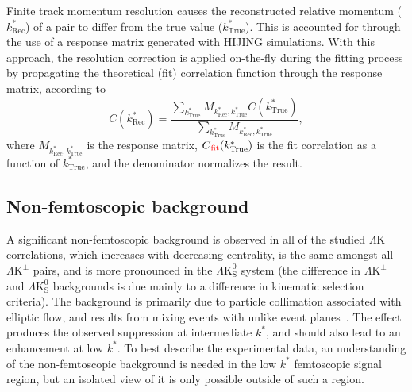 \documentclass[ALICE,manyauthors]{cernphprep}
\newcommand{\kstar}{$k^{*}$\xspace}
\newcommand{\ktrue}{$k^{*}_{\mathrm{True}}$\xspace}
\newcommand{\krec}{$k^{*}_{\mathrm{Rec}}$\xspace}
\newcommand{\LamK}{$\Lambda$K\xspace}
\newcommand{\LamKpm}{$\Lambda\mathrm{K^{\pm}}$\xspace}
\newcommand{\LamKs}{$\Lambda\mathrm{K^{0}_{S}}$\xspace}
\begin{document}
Finite track momentum resolution causes the reconstructed relative momentum (\krec) of a pair to differ from the true value (\ktrue).
This is accounted for through the use of a response matrix generated with HIJING simulations.
With this approach, the resolution correction is applied on-the-fly during the fitting process by propagating the theoretical (fit) correlation function through the response matrix, according to
\begin{equation}
  C(k^{*}_{\mathrm{Rec}}) = \dfrac{\sum\limits_{k^{*}_{\mathrm{True}}}M_{k^{*}_{\mathrm{Rec}},k^{*}_{\mathrm{True}}}C(k^{*}_{\mathrm{True}})}{\sum\limits_{k^{*}_{\mathrm{True}}}M_{k^{*}_{\mathrm{Rec}},k^{*}_{\mathrm{True}}}},
\label{eqn:MomResCorrection}
\end{equation}
where $M_{k^{*}_{\mathrm{Rec}},k^{*}_{\mathrm{True}}}$ is the response matrix, $C{\color{red}_{\mathrm{fit}}}(k^{*}_{\mathrm{True}})$ is the {\color{red}fit} {\color{blue}correlation} as a function of \ktrue, and the denominator normalizes the result.


\subsection{Non-femtoscopic background}
\label{NonFlatBackground}

A significant non-femtoscopic background is observed in all of the studied \LamK correlations, which increases with decreasing centrality, is the same amongst all \LamKpm pairs, and is more pronounced in the \LamKs system (the difference in \LamKpm and \LamKs backgrounds is due mainly to a difference in kinematic selection criteria).  
The background is primarily due to particle collimation associated with elliptic flow, and results from mixing events with unlike event planes~\cite{Kisiel:2017}.
The effect produces the observed suppression at intermediate \kstar, and should also lead to an enhancement at low \kstar.
To best describe the experimental data, an understanding of the non-femtoscopic background is needed in the low \kstar femtoscopic signal region, but an isolated view of it is only possible outside of such a region.
\end{document}
